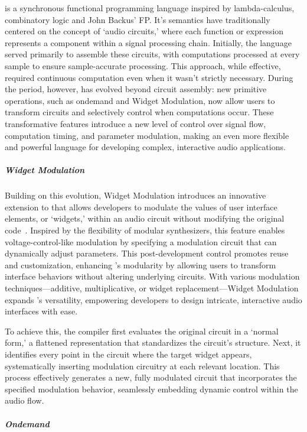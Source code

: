 \F{} is a synchronous functional programming language inspired by lambda-calculus, 
combinatory logic and John Backus’ FP.
It's semantics have traditionally centered on the concept of `audio
circuits,' where each function or expression represents a component
within a signal processing chain. Initially, the language served
primarily to assemble these circuits, with computations processed at
every sample to ensure sample-accurate processing. This approach, while
effective, required continuous computation even when it wasn't strictly
necessary. During the period, however, \F{} has evolved beyond circuit
assembly: new primitive operations, such as ondemand and Widget
Modulation, now allow users to transform circuits and selectively
control when computations occur. These transformative features introduce
a new level of control over signal flow, computation timing, and
parameter modulation, making \F{} an even more flexible and powerful
language for developing complex, interactive audio applications.

\subparagraph{Widget Modulation}

Building on this evolution, Widget Modulation introduces an innovative
extension to \F{} that allows developers to modulate the values of user
interface elements, or `widgets,' within an audio circuit without
modifying the original code~\cite{orlarey:hal-04762253}. Inspired by the flexibility of modular
synthesizers, this feature enables voltage-control-like modulation by
specifying a modulation circuit that can dynamically adjust parameters.
This post-development control promotes reuse and customization,
enhancing \F{}'s modularity by allowing users to transform interface
behaviors without altering underlying circuits. With various modulation
techniques---additive, multiplicative, or widget replacement---Widget
Modulation expands \F{}'s versatility, empowering developers to design
intricate, interactive audio interfaces with ease.

To achieve this, the \F{} compiler first evaluates the original circuit
in a `normal form,' a flattened representation that standardizes the
circuit's structure. Next, it identifies every point in the circuit
where the target widget appears, systematically inserting modulation
circuitry at each relevant location. This process effectively generates
a new, fully modulated circuit that incorporates the specified
modulation behavior, seamlessly embedding dynamic control within the
audio flow.

\subparagraph{Ondemand}

